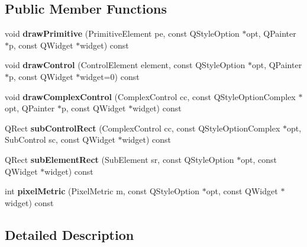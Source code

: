 \subsection*{Public Member Functions}
\begin{DoxyCompactItemize}
\item 
\hypertarget{class_dark_blue_style_a952b59123749dc43452381d9519f2665}{void {\bfseries draw\-Primitive} (Primitive\-Element pe, const Q\-Style\-Option $\ast$opt, Q\-Painter $\ast$p, const Q\-Widget $\ast$widget) const }\label{class_dark_blue_style_a952b59123749dc43452381d9519f2665}

\item 
\hypertarget{class_dark_blue_style_adb59d9b10f9ddcfe04e6daf46d664644}{void {\bfseries draw\-Control} (Control\-Element element, const Q\-Style\-Option $\ast$opt, Q\-Painter $\ast$p, const Q\-Widget $\ast$widget=0) const }\label{class_dark_blue_style_adb59d9b10f9ddcfe04e6daf46d664644}

\item 
\hypertarget{class_dark_blue_style_a7013680c7fcc0732da6a8b1842c00428}{void {\bfseries draw\-Complex\-Control} (Complex\-Control cc, const Q\-Style\-Option\-Complex $\ast$opt, Q\-Painter $\ast$p, const Q\-Widget $\ast$widget) const }\label{class_dark_blue_style_a7013680c7fcc0732da6a8b1842c00428}

\item 
\hypertarget{class_dark_blue_style_aecee0c1fca95bbc1cee06af06e9eeabd}{Q\-Rect {\bfseries sub\-Control\-Rect} (Complex\-Control cc, const Q\-Style\-Option\-Complex $\ast$opt, Sub\-Control sc, const Q\-Widget $\ast$widget) const }\label{class_dark_blue_style_aecee0c1fca95bbc1cee06af06e9eeabd}

\item 
\hypertarget{class_dark_blue_style_a8f7d0c9dc83b7b455bfead0ac089a10b}{Q\-Rect {\bfseries sub\-Element\-Rect} (Sub\-Element sr, const Q\-Style\-Option $\ast$opt, const Q\-Widget $\ast$widget) const }\label{class_dark_blue_style_a8f7d0c9dc83b7b455bfead0ac089a10b}

\item 
\hypertarget{class_dark_blue_style_a13da0c2962cb0350caa3b378eee26bf0}{int {\bfseries pixel\-Metric} (Pixel\-Metric m, const Q\-Style\-Option $\ast$opt, const Q\-Widget $\ast$widget) const }\label{class_dark_blue_style_a13da0c2962cb0350caa3b378eee26bf0}

\end{DoxyCompactItemize}


\subsection{Detailed Description}


